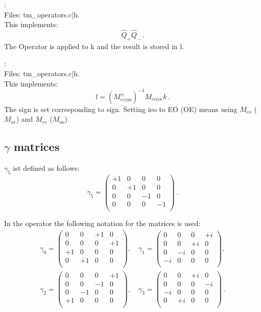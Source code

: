 :\\
Files: {\ttfamily tm\_operators.c|h}.\\
This implements:
\[
\hat Q_{+} \hat Q_{-}\, .
\]
The Operator is applied to {\ttfamily k} and the result is stored in
{\ttfamily l}.

:\\
Files:  {\ttfamily tm\_operators.c|h}.\\
This implements:
\[
l = (M_{ee|oo}^\pm)^{-1} M_{eo|oe} k\, .
\]
The sign is set corresponding to {\ttfamily sign}. Setting {\ttfamily
  ieo} to {\ttfamily EO} ({\ttfamily OE}) means using $M_{eo}$
($M_{oe}$) and $M_{ee}$ ($M_{oo}$).

\subsection{$\gamma$ matrices}

$\gamma_5$ ist defined as follows:
\[
  \gamma_5 =
  \begin{pmatrix}
    +1 & 0 & 0 & 0 \\
    0 & +1 & 0 & 0 \\
    0 & 0 & -1 & 0 \\
    0 & 0 & 0 & -1 \\    
  \end{pmatrix}\ .
\]

In the operator the following notation for
the matrices is used:
\[
\begin{split}
  \gamma_0 = \begin{pmatrix}
    0 & 0 & +1 & 0 \\
    0 & 0 & 0 & +1 \\
    +1 & 0 & 0 & 0 \\
    0 & +1 & 0 & 0 \\
  \end{pmatrix},\quad
  \gamma_1 =\begin{pmatrix}
    0 & 0 & 0 & +i \\
    0 & 0 & +i & 0 \\
    0 & -i & 0 & 0 \\
    -i & 0 & 0 & 0 \\    
  \end{pmatrix},\\
  \gamma_2 = \begin{pmatrix}
    0 & 0 & 0 & +1 \\
    0 & 0 & -1 & 0 \\
    0 & -1 & 0 & 0 \\
    +1 & 0 & 0 & 0 \\   
  \end{pmatrix},\quad
  \gamma_3 =\begin{pmatrix}
    0 & 0 & +i & 0 \\
    0 & 0 & 0 & -i \\
    -i & 0 & 0 & 0 \\
    0 & +i & 0 & 0 \\
  \end{pmatrix}\ .\\
\end{split}
\]


